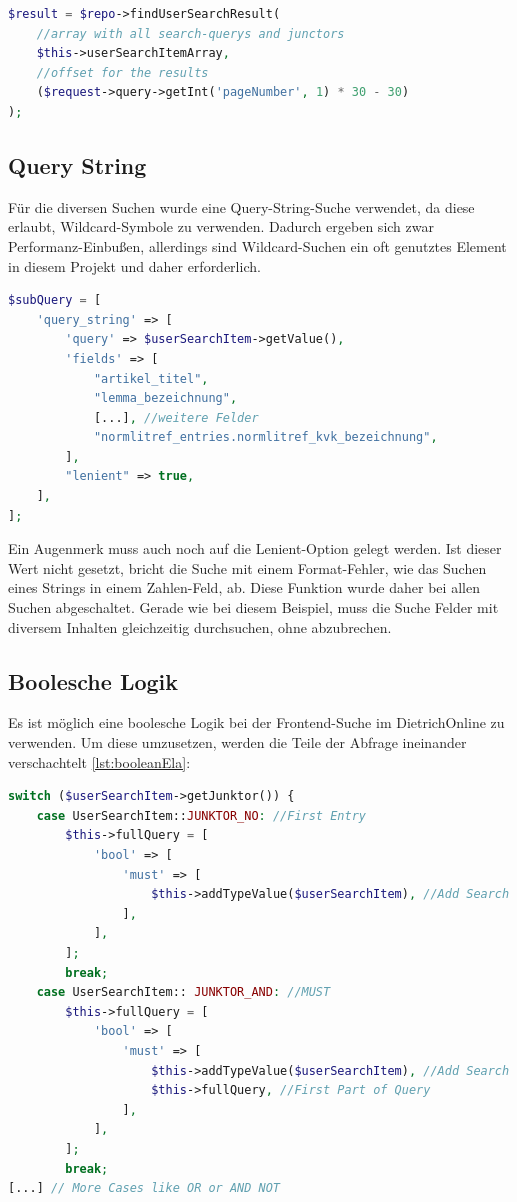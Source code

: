 \begin{lstlisting}[language=PHP, frame=single, label={lst:generierung},  caption=Generierung des Offsets für die Paginierung,captionpos=b] 
$result = $repo->findUserSearchResult(
    //array with all search-querys and junctors
    $this->userSearchItemArray, 
    //offset for the results
    ($request->query->getInt('pageNumber', 1) * 30 - 30)
);
\end{lstlisting}

\subsection{Query String}
Für die diversen Suchen wurde eine Query-String-Suche verwendet, da diese erlaubt, Wildcard-Symbole zu verwenden. Dadurch ergeben sich zwar Performanz-Einbußen, allerdings sind Wildcard-Suchen ein oft genutztes Element in diesem Projekt und daher erforderlich.

\begin{lstlisting}[language=PHP, frame=single, label={lst:aufbauQueryString}, caption=Beispiel eines Query-Strings,captionpos=b] 
$subQuery = [
    'query_string' => [
        'query' => $userSearchItem->getValue(),
        'fields' => [
            "artikel_titel",
            "lemma_bezeichnung",
            [...], //weitere Felder
            "normlitref_entries.normlitref_kvk_bezeichnung",
        ],
        "lenient" => true,
    ],
];
\end{lstlisting}

Ein Augenmerk muss auch noch auf die Lenient-Option gelegt werden. Ist dieser Wert nicht gesetzt, bricht die Suche mit einem Format-Fehler, wie das Suchen eines Strings in einem Zahlen-Feld, ab. Diese Funktion wurde daher bei allen Suchen abgeschaltet. Gerade wie bei diesem Beispiel, muss die Suche Felder mit diversem Inhalten gleichzeitig durchsuchen, ohne abzubrechen. 

\subsection{Boolesche Logik}

Es ist möglich eine boolesche Logik bei der Frontend-Suche im DietrichOnline zu verwenden. Um diese umzusetzen, werden die Teile der Abfrage ineinander verschachtelt \ref{lst:booleanEla}:

\begin{lstlisting}[language=PHP, frame=single, label={lst:booleanEla}, caption=Auschnitt aus der boolischen Logik für das DietrichOnline-Projekt,captionpos=b] 
switch ($userSearchItem->getJunktor()) {
    case UserSearchItem::JUNKTOR_NO: //First Entry
        $this->fullQuery = [
            'bool' => [
                'must' => [
                    $this->addTypeValue($userSearchItem), //Add Search
                ],
            ],
        ];
        break;
    case UserSearchItem:: JUNKTOR_AND: //MUST
        $this->fullQuery = [
            'bool' => [
                'must' => [
                    $this->addTypeValue($userSearchItem), //Add Search
                    $this->fullQuery, //First Part of Query
                ],
            ],
        ];
        break;
[...] // More Cases like OR or AND NOT
\end{lstlisting}

